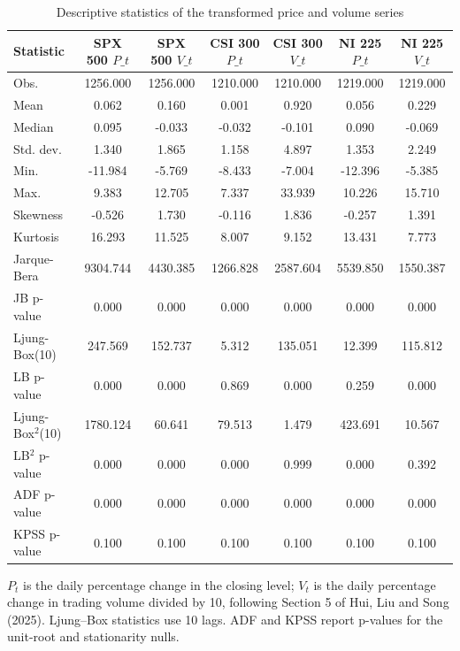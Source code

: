 \begin{table}[htbp]
\centering
\caption{Descriptive statistics of the transformed price and volume series}
\label{tab:descriptives}
\small
\begin{tabular}{lcccccc}
\toprule
Statistic & SPX 500  $P\_t$ & SPX 500  $V\_t$ & CSI 300  $P\_t$ & CSI 300  $V\_t$ & NI 225  $P\_t$ & NI 225  $V\_t$ \\
\midrule
Obs. & 1256.000 & 1256.000 & 1210.000 & 1210.000 & 1219.000 & 1219.000 \\
Mean & 0.062 & 0.160 & 0.001 & 0.920 & 0.056 & 0.229 \\
Median & 0.095 & -0.033 & -0.032 & -0.101 & 0.090 & -0.069 \\
Std. dev. & 1.340 & 1.865 & 1.158 & 4.897 & 1.353 & 2.249 \\
Min. & -11.984 & -5.769 & -8.433 & -7.004 & -12.396 & -5.385 \\
Max. & 9.383 & 12.705 & 7.337 & 33.939 & 10.226 & 15.710 \\
Skewness & -0.526 & 1.730 & -0.116 & 1.836 & -0.257 & 1.391 \\
Kurtosis & 16.293 & 11.525 & 8.007 & 9.152 & 13.431 & 7.773 \\
Jarque-Bera & 9304.744 & 4430.385 & 1266.828 & 2587.604 & 5539.850 & 1550.387 \\
JB p-value & 0.000 & 0.000 & 0.000 & 0.000 & 0.000 & 0.000 \\
Ljung-Box(10) & 247.569 & 152.737 & 5.312 & 135.051 & 12.399 & 115.812 \\
LB p-value & 0.000 & 0.000 & 0.869 & 0.000 & 0.259 & 0.000 \\
Ljung-Box$^2$(10) & 1780.124 & 60.641 & 79.513 & 1.479 & 423.691 & 10.567 \\
LB$^2$ p-value & 0.000 & 0.000 & 0.000 & 0.999 & 0.000 & 0.392 \\
ADF p-value & 0.000 & 0.000 & 0.000 & 0.000 & 0.000 & 0.000 \\
KPSS p-value & 0.100 & 0.100 & 0.100 & 0.100 & 0.100 & 0.100 \\
\bottomrule
\end{tabular}

\begin{minipage}{\linewidth}\footnotesize
$P_t$ is the daily percentage change in the closing level; $V_t$ is the daily percentage change in trading volume divided by 10, following Section 5 of Hui, Liu and Song (2025).  Ljung--Box statistics use 10 lags.  ADF and KPSS report p-values for the unit-root and stationarity nulls.
\end{minipage}
\end{table}
